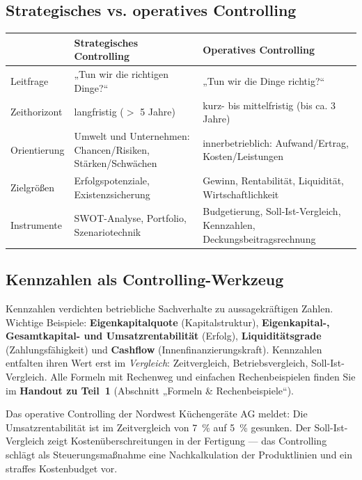 \documentclass[11pt, a4paper]{article}
\begin{document}
\subsection{Strategisches vs. operatives Controlling}

\begin{center}
\begin{tabular}{p{3.2cm} p{5.2cm} p{5.2cm}}
 & \textbf{Strategisches Controlling} & \textbf{Operatives Controlling}\\
\hline
Leitfrage & „Tun wir die richtigen Dinge?`` & „Tun wir die Dinge richtig?``\\
Zeithorizont & langfristig ($>$ 5 Jahre) & kurz- bis mittelfristig (bis ca. 3 Jahre)\\
Orientierung & Umwelt und Unternehmen: Chancen/Risiken, Stärken/Schwächen & innerbetrieblich:
Aufwand/Ertrag, Kosten/Leistungen\\
Zielgrößen & Erfolgspotenziale, Existenzsicherung & Gewinn, Rentabilität, Liquidität,
Wirtschaftlichkeit\\
Instrumente & SWOT-Analyse, Portfolio, Szenariotechnik & Budgetierung, Soll-Ist-Vergleich,
Kennzahlen, Deckungsbeitragsrechnung\\
\end{tabular}
\end{center}

\subsection{Kennzahlen als Controlling-Werkzeug}

Kennzahlen verdichten betriebliche Sachverhalte zu aussagekräftigen Zahlen. Wichtige
Beispiele: \textbf{Eigenkapitalquote} (Kapitalstruktur), \textbf{Eigenkapital-,
Gesamtkapital- und Umsatzrentabilität} (Erfolg), \textbf{Liquiditätsgrade}
(Zahlungsfähigkeit) und \textbf{Cashflow} (Innenfinanzierungskraft). Kennzahlen
entfalten ihren Wert erst im \emph{Vergleich}: Zeitvergleich, Betriebsvergleich,
Soll-Ist-Vergleich. Alle Formeln mit Rechenweg und einfachen Rechenbeispielen finden
Sie im \textbf{Handout zu Teil~1} (Abschnitt „Formeln \& Rechenbeispiele``).

\begin{beispiel}
Das operative Controlling der Nordwest Küchengeräte AG meldet: Die Umsatzrentabilität
ist im Zeitvergleich von 7~\% auf 5~\% gesunken. Der Soll-Ist-Vergleich zeigt
Kostenüberschreitungen in der Fertigung --- das Controlling schlägt als Steuerungsmaßnahme
eine Nachkalkulation der Produktlinien und ein straffes Kostenbudget vor.
\end{beispiel}
\end{document}
